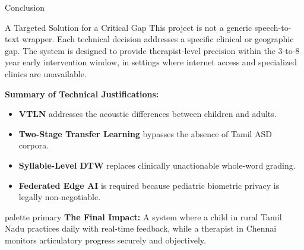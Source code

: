 \documentclass[aspectratio=169, 11pt, xcolor=table]{beamer}
\begin{document}
\begin{frame}{Conclusion}
    \vspace{2mm}
    \begin{block}{A Targeted Solution for a Critical Gap}
        \small
        This project is not a generic speech-to-text wrapper. Each technical decision addresses a specific clinical or geographic gap. The system is designed to provide therapist-level precision within the 3-to-8 year early intervention window, in settings where internet access and specialized clinics are unavailable.
    \end{block}
    
    \vspace{2mm}
    \textbf{Summary of Technical Justifications:}
    \begin{itemize}
        \item \textbf{VTLN} addresses the acoustic differences between children and adults.
        \item \textbf{Two-Stage Transfer Learning} bypasses the absence of Tamil ASD corpora.
        \item \textbf{Syllable-Level DTW} replaces clinically unactionable whole-word grading.
        \item \textbf{Federated Edge AI} is required because pediatric biometric privacy is legally non-negotiable.
    \end{itemize}

    \vspace{2mm}
    \begin{beamercolorbox}[sep=4pt, center, rounded=true]{palette primary}
        \footnotesize \textbf{The Final Impact:} A system where a child in rural Tamil Nadu practices daily with real-time feedback, while a therapist in Chennai monitors articulatory progress securely and objectively.
    \end{beamercolorbox}
\end{frame}
\end{document}

